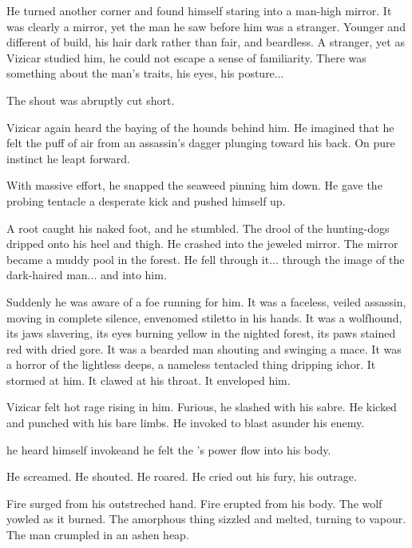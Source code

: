 He turned another corner and found himself staring into a man-high mirror. It was clearly a mirror, yet the man he saw before him was a stranger. Younger and different of build, his hair dark rather than fair, and beardless. A stranger, yet as Vizicar studied him, he could not escape a sense of familiarity. There was something about the man's traits, his eyes, his posture...

The shout was abruptly cut short. 

Vizicar again heard the baying of the hounds behind him. He imagined that he felt the puff of air from an assassin's dagger plunging toward his back. On pure instinct he leapt forward. 

With massive effort, he snapped the seaweed pinning him down. He gave the probing tentacle a desperate kick and pushed himself up. 

A root caught his naked foot, and he stumbled. The drool of the hunting-dogs dripped onto his heel and thigh. He crashed into the jeweled mirror. The mirror became a muddy pool in the forest. He fell through it... through the image of the dark-haired man... and into him. 

Suddenly he was aware of a foe running for him. 
It was a faceless, veiled assassin, moving in complete silence, envenomed stiletto in his hands. 
It was a wolfhound, its jaws slavering, its eyes burning yellow in the nighted forest, its paws stained red with dried gore. 
It was a bearded man shouting and swinging a mace. 
It was a horror of the lightless deeps, a nameless tentacled thing dripping ichor. It stormed at him. It clawed at his throat. It enveloped him. 

Vizicar felt hot rage rising in him. Furious, he slashed with his sabre. He kicked and punched with his bare limbs. He invoked \Archons{} to blast asunder his enemy. 

 he heard himself invoke\dash{}\dash and he felt the \Sephirah's power flow into his body. 


He screamed. He shouted. He roared. He cried out his fury, his outrage. 


 Fire surged from his outstreched hand. Fire erupted from his body. The wolf yowled as it burned. The amorphous thing sizzled and melted, turning to vapour. The man crumpled in an ashen heap. 

